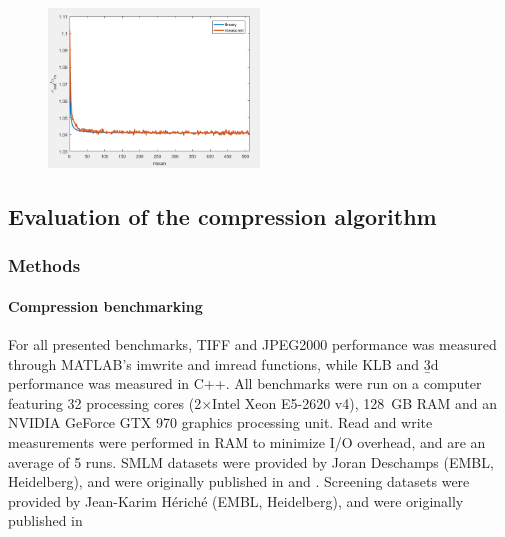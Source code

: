     \begin{figure}
      \centering
      \includegraphics[width=0.5\textwidth]{extraNoise}
      \label{fig:extraNoise}
    \end{figure}

  \subsection{Evaluation of the compression algorithm}
    \label{sec:evalB3D}

    \subsubsection{Methods}
  \label{sec:methodsB3D}
\paragraph{Compression benchmarking}
For all presented benchmarks, TIFF and JPEG2000 performance was measured through MATLAB's imwrite and imread functions, while KLB and \b3d performance was measured in C++. All benchmarks were run on a computer featuring 32 processing cores (2×Intel Xeon E5-2620 v4), \SI{128}{GB} RAM and an NVIDIA GeForce GTX 970 graphics processing unit. Read and write measurements were performed in RAM to minimize I/O overhead, and are an average of 5 runs. SMLM datasets were provided by Joran Deschamps (EMBL, Heidelberg), and were originally published in \cite{deschamps_3d_2014} and \cite{deschamps_efficient_2016}. Screening datasets were provided by Jean-Karim Hériché (EMBL, Heidelberg), and were originally published in \cite{simpson_genome-wide_2012}

